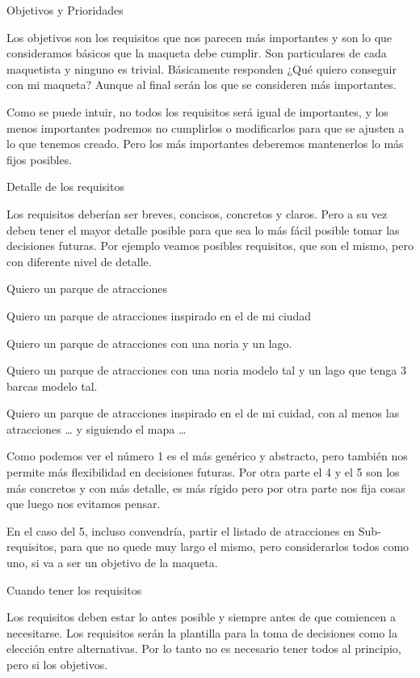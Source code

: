 

Objetivos y Prioridades 

Los objetivos son los requisitos que nos parecen más importantes y son lo que consideramos básicos que la maqueta debe cumplir. Son particulares de cada maquetista y ninguno es trivial. Básicamente responden ¿Qué quiero conseguir con mi maqueta? Aunque al final serán los que se consideren más importantes. 

 

Como se puede intuir, no todos los requisitos será igual de importantes, y los menos importantes podremos no cumplirlos o modificarlos para que se ajusten a lo que tenemos creado. Pero los más importantes deberemos mantenerlos lo más fijos posibles. 

 

Detalle de los requisitos 

Los requisitos deberían ser breves, concisos, concretos y claros. Pero a su vez deben tener el mayor detalle posible para que sea lo más fácil posible tomar las decisiones futuras. Por ejemplo veamos posibles requisitos, que son el mismo, pero con diferente nivel de detalle. 

Quiero un parque de atracciones 

Quiero un parque de atracciones inspirado en el de mi ciudad 

Quiero un parque de atracciones con una noria y un lago. 

Quiero un parque de atracciones con una noria modelo tal y un lago que tenga 3 barcas modelo tal. 

Quiero un parque de atracciones inspirado en el de mi cuidad, con al menos las atracciones … y siguiendo el mapa … 

Como podemos ver el número 1 es el más genérico y abstracto, pero también nos permite más flexibilidad en decisiones futuras. Por otra parte el 4 y el 5 son los más concretos y con más detalle, es más rígido pero por otra parte nos fija cosas que luego nos evitamos pensar. 

 

En el caso del 5, incluso convendría, partir el listado de atracciones en Sub-requisitos, para que no quede muy largo el mismo, pero considerarlos todos como uno, si va a ser un objetivo de la maqueta. 

Cuando tener los requisitos 

Los requisitos deben estar lo antes posible y siempre antes de que comiencen a necesitarse. Los requisitos serán la plantilla para la toma de decisiones como la elección entre alternativas. Por lo tanto no es necesario tener todos al principio, pero si los objetivos. 

